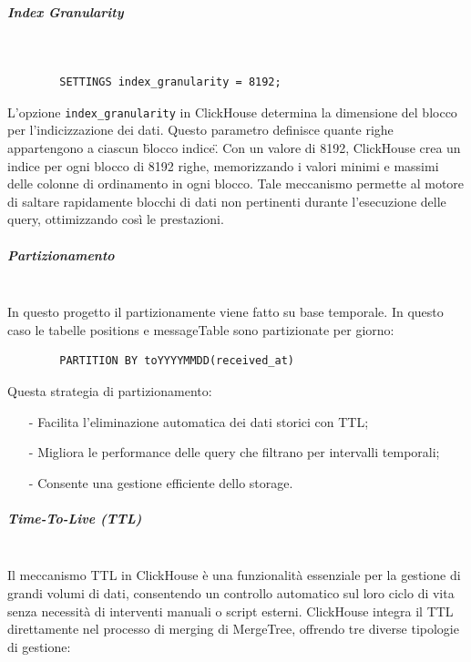 \documentclass[10pt]{article}
\newcommand{\mysubparagraph}[1]{\subparagraph{#1}\mbox{}\\}
\begin{document}
        \mysubparagraph{Index Granularity}
        \begin{lstlisting}
        SETTINGS index_granularity = 8192;
        \end{lstlisting}
        L'opzione \texttt{index\_granularity} in ClickHouse determina la dimensione del blocco per l'indicizzazione dei dati.
        Questo parametro definisce quante righe appartengono a ciascun \"blocco indice\". Con un valore di 8192,
        ClickHouse crea un indice per ogni blocco di 8192 righe, memorizzando i valori minimi e massimi delle
        colonne di ordinamento in ogni blocco. Tale meccanismo permette al motore di saltare rapidamente blocchi di
        dati non pertinenti durante l'esecuzione delle query, ottimizzando così le prestazioni.



        \mysubparagraph{Partizionamento}
        In questo progetto il partizionamente viene fatto su base temporale. In questo caso le tabelle positions e messageTable sono partizionate per giorno:
        \begin{lstlisting}
        PARTITION BY toYYYYMMDD(received_at)
        \end{lstlisting}
        Questa strategia di partizionamento:
        \begin{itemize}
            \item[-] Facilita l'eliminazione automatica dei dati storici con TTL;
            \item[-] Migliora le performance delle query che filtrano per intervalli temporali;
            \item[-] Consente una gestione efficiente dello storage.
        \end{itemize}

        \mysubparagraph{Time-To-Live (TTL)}
        Il meccanismo TTL in ClickHouse è una funzionalità essenziale per la gestione di grandi volumi di dati, consentendo un controllo automatico sul loro ciclo di vita senza necessità di interventi manuali o script esterni.
        ClickHouse integra il TTL direttamente nel processo di merging di MergeTree, offrendo tre diverse tipologie di gestione:
\end{document}
